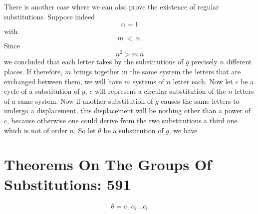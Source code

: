 \documentclass[11pt,fancy]{elegantbook}
\begin{document}
There is another case where we can also prove the existence of regular substitutions. Suppose indeed 
\begin{equation}
    \alpha=1
\end{equation}
with 
\begin{equation}
    m \ < \ n.
\end{equation} 
Since 
\begin{equation}
    n^2  > {m \ n}
\end{equation}
we concluded that each letter takes by the substitutions of $g$ precisely $n$ different places. If therefore, $m$ brings together in the same system the letters that are exchanged between them, we will have $m$ systems of $n$ letter each. Now let $c$ be a cycle of a substitution of $g$, $c$ will represent a circular substitution of the $n$ letters of a same system. Now if another substitution of $g$ causes the same letters to undergo a displacement, this displacement will be nothing other than a power of $c$, because otherwise one could derive from the two substitutions a third one which is not of order $n$. So let $\theta$ be a substitution of $g$, we have 


\section{Theorems On The Groups Of Substitutions: 591}

\begin{equation}
    \theta=c_1 \ c_2 \dots c_r
\end{equation}
\end{document}
